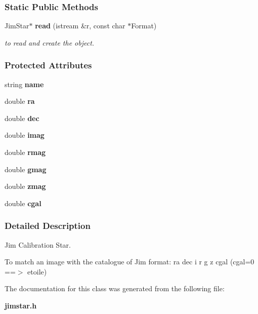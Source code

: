 \subsubsection*{Static Public Methods}
\begin{CompactItemize}
\item 
{}
Jim\-Star$\ast$ {\bf read} (istream \&r, const char $\ast$Format)\label{class_jimstar_d0}

\begin{CompactList}\small\item\em to read and create the object.\item\end{CompactList}\end{CompactItemize}
\subsubsection*{Protected Attributes}
\begin{CompactItemize}
\item 
{}
string {\bf name}\label{class_jimstar_n0}

\item 
{}
double {\bf ra}\label{class_jimstar_n1}

\item 
{}
double {\bf dec}\label{class_jimstar_n2}

\item 
{}
double {\bf imag}\label{class_jimstar_n3}

\item 
{}
double {\bf rmag}\label{class_jimstar_n4}

\item 
{}
double {\bf gmag}\label{class_jimstar_n5}

\item 
{}
double {\bf zmag}\label{class_jimstar_n6}

\item 
{}
double {\bf cgal}\label{class_jimstar_n7}

\end{CompactItemize}


\subsubsection{Detailed Description}
Jim Calibration Star.

To match an image with the catalogue of Jim  format: ra dec i r g z cgal (cgal=0 ==$>$ etoile) 



The documentation for this class was generated from the following file:\begin{CompactItemize}
\item 
{\bf jimstar.h}\end{CompactItemize}

